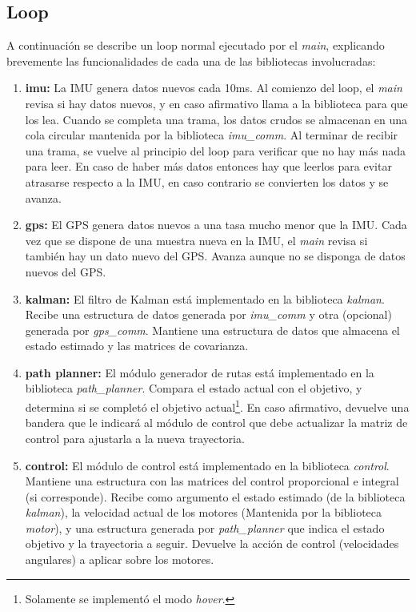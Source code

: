 \documentclass[main]{subfiles}
\begin{document}
\subsection{Loop}
\label{sec:software-loop}

A continuaci\'on se describe un loop normal ejecutado por el \textit{main}, explicando brevemente las funcionalidades de cada una de las bibliotecas involucradas:
\begin{enumerate}

\item \textbf{imu:} La IMU genera datos nuevos cada 10ms. Al comienzo del loop, el \textit{main} revisa si hay datos nuevos, y en caso afirmativo llama a la biblioteca para que los lea. Cuando se completa una trama, los datos crudos se almacenan en una cola circular mantenida por la biblioteca \textit{imu\_comm}. Al terminar de recibir una trama, se vuelve al principio del loop para verificar que no hay m\'as nada para leer. En caso de haber m\'as datos entonces hay que leerlos para evitar atrasarse respecto a la IMU, en caso contrario se convierten los datos y se avanza.

\item \textbf{gps:} El GPS genera datos nuevos a una tasa mucho menor que la IMU. Cada vez que se dispone de una muestra nueva en la IMU, el \textit{main} revisa si tambi\'en hay un dato nuevo del GPS. Avanza aunque no se disponga de datos nuevos del GPS.

\item \textbf{kalman:} El filtro de Kalman est\'a implementado en la biblioteca \textit{kalman}. Recibe una estructura de datos generada por \textit{imu\_comm} y otra (opcional) generada por \textit{gps\_comm}. Mantiene una estructura de datos que almacena el estado estimado y las matrices de covarianza.

\item \textbf{path planner:} El m\'odulo generador de rutas est\'a implementado en la biblioteca \textit{path\_planner}. Compara el estado actual con el objetivo, y determina si se completó el objetivo actual\footnote{Solamente se implement\'o el modo \textit{hover}.}. En caso afirmativo, devuelve una bandera que le indicar\'a al m\'odulo de control que debe actualizar la matriz de control para ajustarla a la nueva trayectoria.

\item \textbf{control:} El m\'odulo de control est\'a implementado en la biblioteca \textit{control}. Mantiene una estructura con las matrices del control proporcional e integral (si corresponde). Recibe como argumento el estado estimado (de la biblioteca \textit{kalman}), la velocidad actual de los motores (Mantenida por la biblioteca \textit{motor}), y una estructura generada por \textit{path\_planner} que indica el estado objetivo y la trayectoria a seguir. Devuelve la acci\'on de control (velocidades angulares) a aplicar sobre los motores.


\end{enumerate}
\end{document}

